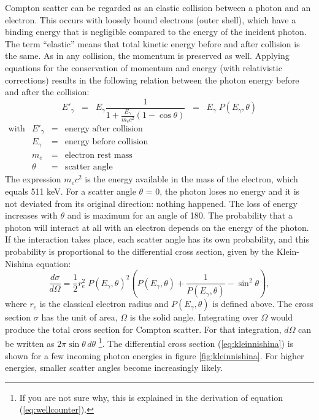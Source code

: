 \documentclass[11pt,oneside]{book}
\begin{document}
Compton scatter can be regarded as an elastic collision between a
photon and an electron. This occurs with loosely bound electrons
(outer shell), which have a binding energy that is negligible compared
to the energy of the incident photon. The term ``elastic'' means that
total kinetic energy before and after collision is the same. As in any
collision, the momentum is preserved as well. Applying equations for
the conservation of momentum and energy (with relativistic
corrections) results in the following relation between the photon
energy before and after the collision:
\begin{equation}
  E'_\gamma \;\;=\;\; E_\gamma \frac{1}{1 
     + \displaystyle\frac{E_\gamma}{m_e c^2} (1 - \cos\theta)} \label{eq:jn_compton_energy}
   \;\; = \;\; E_\gamma \; P(E_\gamma, \theta)
\end{equation}
%
$\begin{array}{llrl}
\mbox{with}
            & E'_\gamma & = & \mbox{energy after collision}\\
            & E_\gamma  & = & \mbox{energy before collision}\\
            & m_e       & = & \mbox{electron rest mass}\\
            & \theta    & = & \mbox{scatter angle}
\end{array}$\\
%
The expression $m_e c^2$ is the energy available in the mass of the
electron, which equals 511 keV. For a scatter angle $\theta$ = 0, the
photon loses no energy and it is not deviated from its original
direction: nothing happened.  The loss of energy increases with
$\theta$ and is maximum for an angle of 180\textdegree. The probability
that a photon will interact at all with an electron depends on the
energy of the photon. If the interaction takes place, each scatter
angle has its own probability, and this probability is proportional to
the differential cross section, given by the Klein-Nishina equation:
\begin{equation}
 \frac{d\sigma}{d\Omega} = \frac{1}{2} r_e^2 \; P(E_\gamma, \theta)^2
    \left( P(E_\gamma, \theta) + \frac{1}{P(E_\gamma, \theta)} - \sin^2\theta \right),
    \label{eq:kleinnishina}
\end{equation}
where $r_e$ is the classical electron radius and $P(E_\gamma, \theta)$
is defined above. The cross section $\sigma$ has the unit of area,
$\Omega$ is the solid angle. Integrating over $\Omega$
would produce the total cross section for Compton scatter. For that
integration, $d\Omega$ can be written as $2 \pi \sin\theta \,d\theta$
\footnote{If you are not sure why, this is explained in the derivation
  of equation (\ref{eq:wellcounter}).}.
The differential cross section (\ref{eq:kleinnishina}) is shown for a
few incoming photon energies in figure \ref{fig:kleinnishina}. For
higher energies, smaller scatter angles become increasingly likely.
\end{document}
